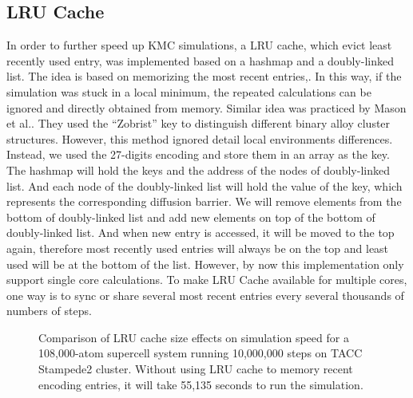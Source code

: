 \subsection{\acf{LRU} Cache}
In order to further speed up \ac{KMC} simulations, a \acf{LRU} cache, which evict least recently used entry, was implemented based on a hashmap and a  doubly-linked list. The idea is based on memorizing the most recent entries,. In this way, if the simulation was stuck in a local minimum, the repeated calculations can be ignored and directly obtained from memory. Similar idea was practiced by Mason et al.\cite{mason2005fast}. They used the ``Zobrist'' key to distinguish different binary alloy cluster structures. However, this method ignored detail local environments differences. Instead, we used the 27-digits encoding and store them in an array as the key. The hashmap will hold the keys and the address of the nodes of doubly-linked list. And each node of the doubly-linked list will hold the value of the key, which represents the corresponding diffusion barrier. We will remove elements from the bottom of doubly-linked list and add new elements on top of the bottom of doubly-linked list. And when new entry is accessed, it will be moved to the top again, therefore most recently used entries will always be on the top and least used will be at the bottom of the list. However, by now this implementation only support single core calculations. To make \ac{LRU} Cache available for multiple cores, one way is to sync or share several most recent entries every several thousands of numbers of steps.


\begingroup
\begin{figure}[!ht]
  \centering
\caption[Comparison of \acs{LRU} cache size effects on simulation speed for a 108,000-atom supercell system running 10,000,000 steps on TACC Stampede2 cluster.]{Comparison of \acs{LRU} cache size effects on simulation speed for a 108,000-atom supercell system running 10,000,000 steps on TACC Stampede2 cluster. Without using \ac{LRU} cache to memory recent encoding entries, it will take 55,135 seconds to run the simulation.}
\label{Chap:Al/Vac:fig:lru_size}
\end{figure}
\endgroup


